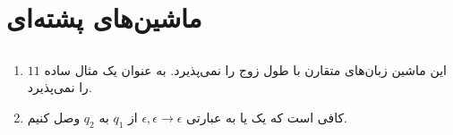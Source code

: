 \section{ماشین‌های پشته‌ای}
\subsection{}
\begin{enumerate}
    \item این ماشین زبان‌های متقارن با طول زوج را نمی‌پذیرد. به عنوان یک مثال ساده
    $11$
    را نمی‌پذیرد.
    \item کافی است که یک  یا به عبارتی
    $\epsilon, \epsilon \rightarrow \epsilon$
    از
    $q_1$ به $q_2$
    وصل کنیم.
\end{enumerate}
\subsection{}
